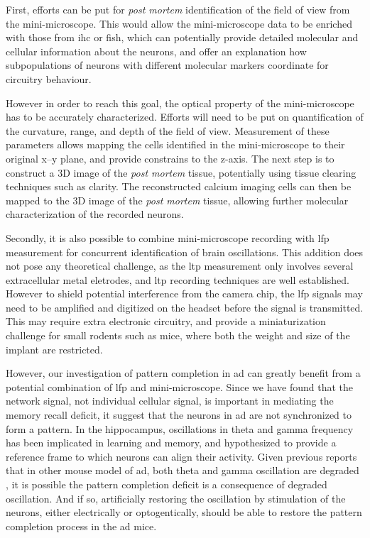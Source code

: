 First, efforts can be put for \textit{post mortem} identification of the field of view from the mini-microscope. This would allow the mini-microscope data to be enriched with those from \gls{ihc} or \gls{fish}, which can potentially provide detailed molecular and cellular information about the neurons, and offer an explanation how subpopulations of neurons with different molecular markers coordinate for circuitry behaviour. 

However in order to reach this goal, the optical property of the mini-microscope has to be accurately characterized. Efforts will need to be put on quantification of the curvature, range, and depth of the field of view. Measurement of these parameters allows mapping the cells identified in the mini-microscope to their original x--y plane, and provide constrains to the z-axis. The next step is to construct a 3D image of the \textit{post mortem} tissue, potentially using tissue clearing techniques such as \gls{clarity}. The reconstructed calcium imaging cells can then be mapped to the 3D image of the \textit{post mortem} tissue, allowing further molecular characterization of the recorded neurons. 

Secondly, it is also possible to combine mini-microscope recording with \gls{lfp} measurement for concurrent identification of brain oscillations. This addition does not pose any theoretical challenge, as the \gls{ltp} measurement only involves several extracellular metal eletrodes, and \gls{ltp} recording techniques are well established. However to shield potential interference from the camera chip, the \gls{lfp} signals may need to be amplified and digitized on the headset before the signal is transmitted. This may require extra electronic circuitry, and provide a miniaturization challenge for small rodents such as mice, where both the weight and size of the implant are restricted. 

However, our investigation of pattern completion in \gls{ad} can greatly benefit from a potential combination of \gls{lfp} and mini-microscope. Since we have found that the network signal, not individual cellular signal, is important in mediating the memory recall deficit, it suggest that the neurons in \gls{ad} are not synchronized to form a pattern. In the hippocampus, oscillations in theta and gamma frequency has been implicated in learning and memory, and hypothesized to provide a reference frame to which neurons can align their activity. Given previous reports that in other mouse model of \gls{ad}, both theta and gamma oscillation are degraded , it is possible the pattern completion deficit is a consequence of degraded oscillation. And if so, artificially restoring the oscillation by stimulation of the neurons, either electrically or optogentically, should be able to restore the pattern completion process in the \gls{ad} mice. 


